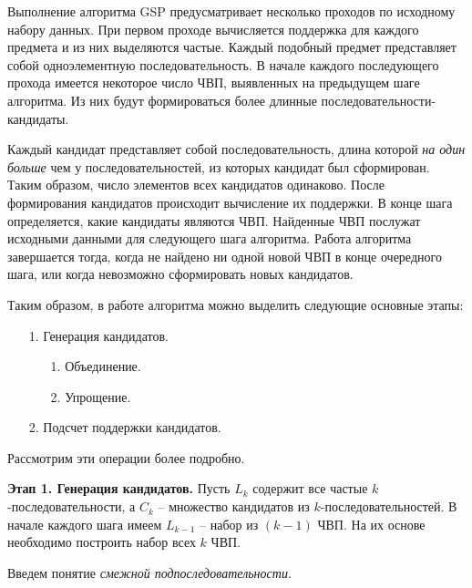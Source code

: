 Выполнение алгоритма GSP предусматривает несколько проходов по исходному набору данных. При первом проходе вычисляется поддержка для каждого предмета и из них выделяются частые. Каждый подобный предмет представляет собой одноэлементную последовательность. В начале каждого последующего прохода имеется некоторое число ЧВП, выявленных на предыдущем шаге алгоритма. Из них будут формироваться более длинные последовательности-кандидаты.

Каждый кандидат представляет собой последовательность, длина которой \textit{на один больше} чем у последовательностей, из которых кандидат был сформирован. Таким образом, число элементов всех кандидатов одинаково. После формирования кандидатов происходит вычисление их поддержки. В конце шага определяется, какие кандидаты являются ЧВП. Найденные ЧВП послужат исходными данными для следующего шага алгоритма. Работа алгоритма завершается тогда, когда не найдено ни одной новой ЧВП в конце очередного шага, или когда невозможно сформировать новых кандидатов.

Таким образом, в работе алгоритма можно выделить следующие основные этапы:


\begin{enumerate}
	\item[1.] Генерация кандидатов.
	\begin{enumerate}
		\item[1.] Объединение.
		\item[2.] Упрощение.
	\end{enumerate}
	\item[2.] Подсчет поддержки кандидатов.
\end{enumerate}

Рассмотрим эти операции более подробно.

\textbf{Этап 1. Генерация кандидатов.} Пусть $L_k$ содержит все частые $k$-последовательности, а $C_k$ – множество кандидатов из $k$-последовательностей. В начале каждого шага имеем $L_{k-1}$ – набор из $(k-1)$ ЧВП. На их основе необходимо построить набор всех $k$ ЧВП.

Введем понятие \textit{смежной подпоследовательности}.

